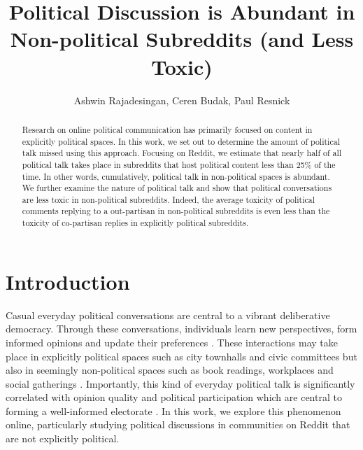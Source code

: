 \documentclass[letterpaper]{article} %
\title{
Political Discussion is Abundant in Non-political Subreddits (and Less Toxic)}
\author{Ashwin Rajadesingan,
Ceren Budak,
Paul Resnick\\}
\begin{document}
\maketitle

\begin{abstract}
Research on online political communication has primarily focused on content in explicitly political spaces. In this work, we set out to determine the amount of political talk missed using this approach. Focusing on Reddit, we estimate that nearly half of all political talk takes place in subreddits that host political content less than 25\% of the time. In other words, cumulatively, political talk in non-political spaces is abundant. We further examine the nature of political talk and show that political conversations are less toxic in non-political subreddits. Indeed, the average toxicity of political comments replying to a out-partisan in non-political subreddits is even less than the toxicity of co-partisan replies in explicitly political subreddits.

\end{abstract}

\section{Introduction}
Casual everyday political conversations are central to a vibrant deliberative democracy. Through these conversations, individuals learn new perspectives, form informed opinions and update their preferences \cite{kim2008theorizing}. These interactions may take place in explicitly political spaces such as city townhalls and civic committees but also in seemingly non-political spaces such as book readings, workplaces and social gatherings \cite{conover2018taking}. Importantly, this kind of everyday political talk is significantly correlated with opinion quality and political participation which are central to forming a well-informed electorate \cite{wyatt2000bridging}. In this work, we explore this phenomenon online, particularly studying political discussions in communities on Reddit that are not explicitly political. 
\end{document}
